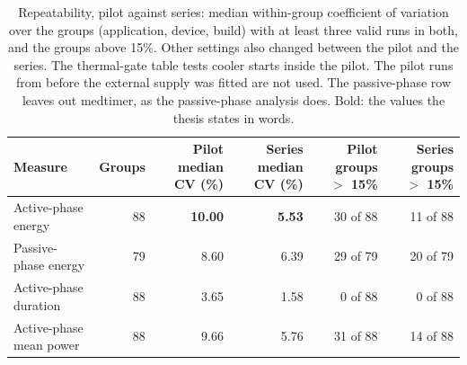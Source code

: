 \begin{table}[t]
\centering
\small
\caption{Repeatability, pilot against series: median within-group coefficient of variation over the groups (application, device, build) with at least three valid runs in both, and the groups above 15\%. Other settings also changed between the pilot and the series. The thermal-gate table tests cooler starts inside the pilot. The pilot runs from before the external supply was fitted are not used. The passive-phase row leaves out medtimer, as the passive-phase analysis does. Bold: the values the thesis states in words.}
\label{tab:pilot-series}
\begin{tabular}{lrrrrr}
\toprule
\textbf{Measure} & \textbf{Groups} & \textbf{Pilot median CV (\%)} & \textbf{Series median CV (\%)} & \textbf{Pilot groups $>$ 15\%} & \textbf{Series groups $>$ 15\%} \\
\midrule
Active-phase energy & 88 & \textbf{10.00} & \textbf{5.53} & 30 of 88 & 11 of 88 \\
Passive-phase energy & 79 & 8.60 & 6.39 & 29 of 79 & 20 of 79 \\
Active-phase duration & 88 & 3.65 & 1.58 & 0 of 88 & 0 of 88 \\
Active-phase mean power & 88 & 9.66 & 5.76 & 31 of 88 & 14 of 88 \\
\bottomrule
\end{tabular}
\end{table}
